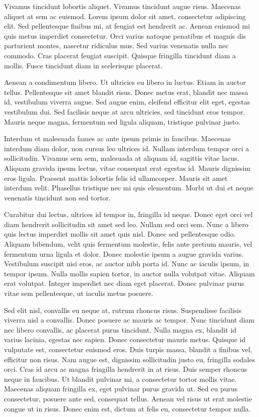 Vivamus tincidunt lobortis aliquet. Vivamus tincidunt augue risus. Maecenas aliquet at sem ac euismod. Lorem ipsum dolor sit amet, consectetur adipiscing elit. Sed pellentesque finibus mi, at feugiat est hendrerit ac. Aenean euismod mi quis metus imperdiet consectetur. Orci varius natoque penatibus et magnis dis parturient montes, nascetur ridiculus mus. Sed varius venenatis nulla nec commodo. Cras placerat feugiat suscipit. Quisque fringilla tincidunt diam a mollis. Fusce tincidunt diam in scelerisque placerat.

Aenean a condimentum libero. Ut ultricies eu libero in luctus. Etiam in auctor tellus. Pellentesque sit amet blandit risus. Donec metus erat, blandit nec massa id, vestibulum viverra augue. Sed augue enim, eleifend efficitur elit eget, egestas vestibulum dui. Sed facilisis neque at arcu ultricies, sed tincidunt eros tempor. Mauris neque magna, fermentum sed ligula aliquam, tristique pulvinar justo.

Interdum et malesuada fames ac ante ipsum primis in faucibus. Maecenas interdum diam dolor, non cursus leo ultrices id. Nullam interdum tempor orci a sollicitudin. Vivamus sem sem, malesuada at aliquam id, sagittis vitae lacus. Aliquam gravida ipsum lectus, vitae consequat erat egestas id. Mauris dignissim eros ligula. Praesent mattis lobortis felis id ullamcorper. Mauris sit amet interdum velit. Phasellus tristique nec mi quis elementum. Morbi ut dui et neque venenatis tincidunt non sed tortor.

Curabitur dui lectus, ultrices id tempor in, fringilla id neque. Donec eget orci vel diam hendrerit sollicitudin sit amet sed leo. Nullam sed orci sem. Nunc a libero quis lectus imperdiet mollis sit amet quis nisl. Donec sed pellentesque odio. Aliquam bibendum, velit quis fermentum molestie, felis ante pretium mauris, vel fermentum urna ligula et dolor. Donec molestie ipsum a augue gravida varius. Vestibulum suscipit nisi eros, ac auctor nibh porta id. Nunc ac iaculis ipsum, in tempor ipsum. Nulla mollis sapien tortor, in auctor nulla volutpat vitae. Aliquam erat volutpat. Integer imperdiet nec diam eget placerat. Donec pulvinar purus vitae sem pellentesque, ut iaculis metus posuere.

Sed elit nisl, convallis eu neque at, rutrum rhoncus risus. Suspendisse facilisis viverra nisl a convallis. Donec posuere ac mauris ac tempor. Nunc tincidunt diam nec libero convallis, ac placerat purus tincidunt. Nulla magna ex, blandit id varius lacinia, egestas nec sapien. Donec consectetur mauris metus. Quisque id vulputate est, consectetur euismod eros. Duis turpis massa, blandit a finibus vel, efficitur non risus. Nam augue est, dignissim sollicitudin justo eu, fringilla sodales orci. Cras id arcu ac magna fringilla hendrerit in at risus. Duis semper rhoncus neque in faucibus. Ut blandit pulvinar mi, a consectetur tortor mollis vitae. Maecenas aliquam fringilla ex, eget pulvinar purus gravida ut. Sed eu purus consectetur, posuere ante sed, consequat tellus. Aenean vel risus ut erat molestie congue ut in risus. Donec enim est, dictum at felis eu, consectetur tempor nulla.

